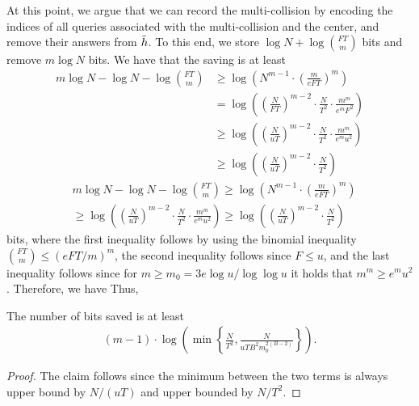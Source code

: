 At this point, we argue that we can record the multi-collision by encoding the indices of all queries associated with the multi-collision and the center, and remove their answers from $\tilde{h}$. 
To this end, we store $\log N+\log\binom{FT}{m}$ bits and remove $m \log N$ bits. 
We have that the saving is at least 
\ifnum{}
\begin{align}
 m\log N - \log N-\log\binom{FT}{m} &\ge \log \left(N^{m-1}\cdot \left(\frac{m}{eFT}\right)^m\right)\nonumber\\
 & = \log \left(\left(\frac{N}{FT}\right)^{m-2}\cdot \frac{N}{T^2} \cdot\frac{m^m}{e^mF^2}\right)\nonumber\\
  & \ge \log \left(\left(\frac{N}{uT}\right)^{m-2}\cdot \frac{N}{T^2} \cdot\frac{m^m}{e^mu^2}\right)\nonumber\\
  & \ge \log \left(\left(\frac{N}{uT}\right)^{m-2}\cdot \frac{N}{T^2}\right) \label{eq:savings5MC}
\end{align}
\else
\begin{align}
 & m\log N - \log N-\log\binom{FT}{m} \ge \log \left(N^{m-1}\cdot \left(\frac{m}{eFT}\right)^m\right)\nonumber\\
 &  \ge \log \left(\left(\frac{N}{uT}\right)^{m-2}\cdot \frac{N}{T^2} \cdot\frac{m^m}{e^mu^2}\right)
  \ge \log \left(\left(\frac{N}{uT}\right)^{m-2}\cdot \frac{N}{T^2}\right) \label{eq:savings5MC}
\end{align}
\fi
bits, where the first inequality follows by using the binomial inequality $\binom{FT}{m}\leq (eFT/m)^m$, the second inequality follows since $F\le u$, and the last inequality follows since for $m \ge m_0 = 3e \log u / \log\log u$ it holds that $m^m \ge e^mu^2$.
\ifnum{} Therefore, we have \else Thus,\fi
\begin{myclaim}
The number of bits saved is at least 
\begin{align*}
(m-1)\cdot\log\left( \min\left\{\frac{N}{T^2},\frac{N}{uTB^2m_0^{2(B-2)}}\right\}\right).
\end{align*} 
\end{myclaim} 
\begin{proof}
The claim follows since the minimum between the two terms is always upper bound by $N/(uT)$ and upper bounded by $N/T^2$.
%
\end{proof}

